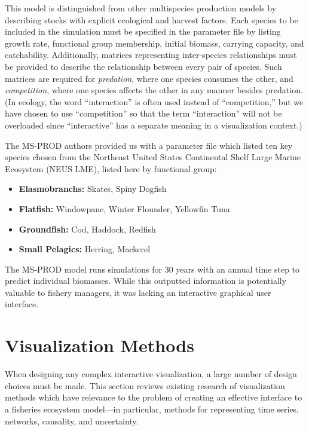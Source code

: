 This model is distinguished from other multispecies production models by describing stocks with explicit ecological and harvest factors.  Each species to be included in the simulation must be specified in the parameter file by listing growth rate, functional group membership, initial biomass, carrying capacity, and catchability.  Additionally, matrices representing inter-species relationships must be provided to describe the relationship between every pair of species.  Such matrices are required for \textit{predation}, where one species consumes the other, and \textit{competition}, where one species affects the other in any manner besides predation.  (In ecology, the word ``interaction'' is often used instead of ``competition,'' but we have chosen to use ``competition'' so that the term ``interaction'' will not be overloaded since ``interactive'' has a separate meaning in a visualization context.)

The MS-PROD authors provided us with a parameter file which listed ten key species chosen from the Northeast United States Continental Shelf Large Marine Ecosystem (NEUS LME), listed here by functional group:%
\begin{itemize}
	\item \textbf{Elasmobranchs:} Skates, Spiny Dogfish
	\item \textbf{Flatfish:} Windowpane, Winter Flounder, Yellowfin Tuna
	\item \textbf{Groundfish:} Cod, Haddock, Redfish
	\item \textbf{Small Pelagics:} 	Herring, Mackerel
\end{itemize}
The MS-PROD model runs simulations for 30 years with an annual time step to predict individual biomasses.  While this outputted information is potentially valuable to fishery managers, it was lacking an interactive graphical user interface.  

\section{Visualization Methods}

When designing any complex interactive visualization, a large number of design choices must be made.  This section reviews existing research of visualization methods which have relevance to the problem of creating an effective interface to a fisheries ecosystem model---in particular, methods for representing time series, networks, causality, and uncertainty.

